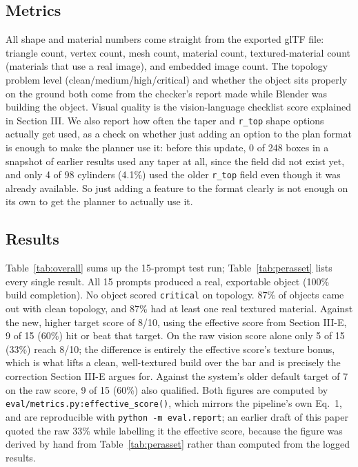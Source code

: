 \documentclass[conference]{IEEEtran}
\begin{document}
\subsection{Metrics}
All shape and material numbers come straight from the exported glTF file: triangle count, vertex count, mesh count, material count, textured-material count (materials that use a real image), and embedded image count. The topology problem level (clean/medium/high/critical) and whether the object sits properly on the ground both come from the checker's report made while Blender was building the object. Visual quality is the vision-language checklist score explained in Section III. We also report how often the taper and \texttt{r\_top} shape options actually get used, as a check on whether just adding an option to the plan format is enough to make the planner use it: before this update, 0 of 248 boxes in a snapshot of earlier results used any taper at all, since the field did not exist yet, and only 4 of 98 cylinders (4.1\%) used the older \texttt{r\_top} field even though it was already available. So just adding a feature to the format clearly is not enough on its own to get the planner to actually use it.

\subsection{Results}
Table~\ref{tab:overall} sums up the 15-prompt test run; Table~\ref{tab:perasset} lists every single result. All 15 prompts produced a real, exportable object (100\% build completion). No object scored \texttt{critical} on topology. 87\% of objects came out with clean topology, and 87\% had at least one real textured material. Against the new, higher target score of 8/10, using the effective score from Section III-E, 9 of 15 (60\%) hit or beat that target. On the raw vision score alone only 5 of 15 (33\%) reach 8/10; the difference is entirely the effective score's texture bonus, which is what lifts a clean, well-textured build over the bar and is precisely the correction Section III-E argues for. Against the system's older default target of 7 on the raw score, 9 of 15 (60\%) also qualified. Both figures are computed by \texttt{eval/metrics.py:effective\_score()}, which mirrors the pipeline's own Eq.~1, and are reproducible with \texttt{python -m eval.report}; an earlier draft of this paper quoted the raw 33\% while labelling it the effective score, because the figure was derived by hand from Table~\ref{tab:perasset} rather than computed from the logged results.
\end{document}
